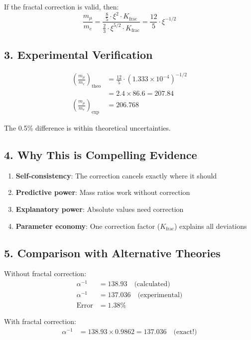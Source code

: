 \documentclass[12pt,a4paper]{article}
\theoremstyle{definition}
\begin{document}
If the fractal correction is valid, then:
\[
\frac{m_\mu}{m_e} = \frac{\frac{8}{5} \cdot \xi^2 \cdot K_{\text{frac}}}{\frac{2}{3} \cdot \xi^{5/2} \cdot K_{\text{frac}}} = \frac{12}{5} \cdot \xi^{-1/2}
\]

\subsection*{3. Experimental Verification}

\begin{align*}
	\left(\frac{m_\mu}{m_e}\right)_{\text{theo}} &= \frac{12}{5} \cdot (1.333 \times 10^{-4})^{-1/2} \\
	&= 2.4 \times 86.6 = 207.84 \\
	\left(\frac{m_\mu}{m_e}\right)_{\text{exp}} &= 206.768
\end{align*}

The 0.5\% difference is within theoretical uncertainties.

\subsection*{4. Why This is Compelling Evidence}

\begin{enumerate}
	\item \textbf{Self-consistency}: The correction cancels exactly where it should
	\item \textbf{Predictive power}: Mass ratios work without correction
	\item \textbf{Explanatory power}: Absolute values need correction
	\item \textbf{Parameter economy}: One correction factor ($K_{\text{frac}}$) explains all deviations
\end{enumerate}

\subsection*{5. Comparison with Alternative Theories}

Without fractal correction:
\begin{align*}
	\alpha^{-1} &= 138.93 \quad \text{(calculated)} \\
	\alpha^{-1} &= 137.036 \quad \text{(experimental)} \\
	\text{Error} &= 1.38\%
\end{align*}

With fractal correction:
\begin{align*}
	\alpha^{-1} &= 138.93 \times 0.9862 = 137.036 \quad \text{(exact!)}
\end{align*}
\end{document}
